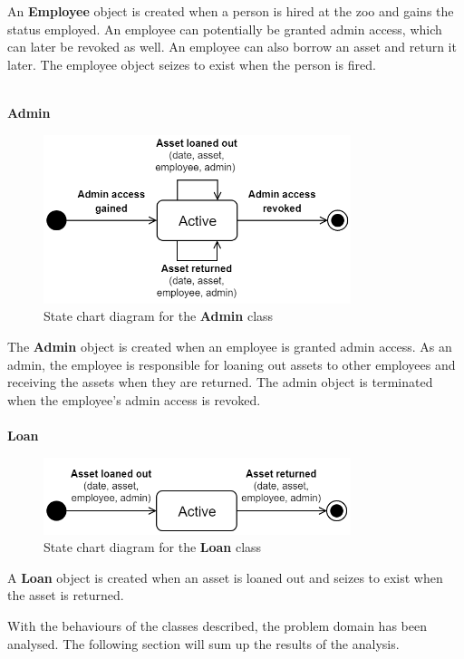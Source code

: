 An \textbf{Employee} object is created when a person is hired at the zoo and gains the status employed. An employee can potentially be granted admin access, which can later be revoked as well. An employee can also borrow an asset and return it later. The employee object seizes to exist when the person is fired.
\\\\


\large{\textbf{Admin}}
\begin{figure}[H]
    \centering
    \includegraphics[width=0.8\textwidth]{figures/StateChart_Admin.png}
    \caption{State chart diagram for the \textbf{Admin} class}
    \label{fig:admin_statechart}
\end{figure}

The \textbf{Admin} object is created when an employee is granted admin access. As an admin, the employee is responsible for loaning out assets to other employees and receiving the assets when they are returned. The admin object is terminated when the employee's admin access is revoked. 
\\\\

\large{\textbf{Loan}}
\begin{figure}[H]
    \centering
    \includegraphics[width=0.8\textwidth]{figures/StateChart_Loan.png}
    \caption{State chart diagram for the \textbf{Loan} class}
    \label{fig:loan_statechart}
\end{figure}

A \textbf{Loan} object is created when an asset is loaned out and seizes to exist when the asset is returned.
\newline\par
With the behaviours of the classes described, the problem domain has been analysed. The following section will sum up the results of the analysis.